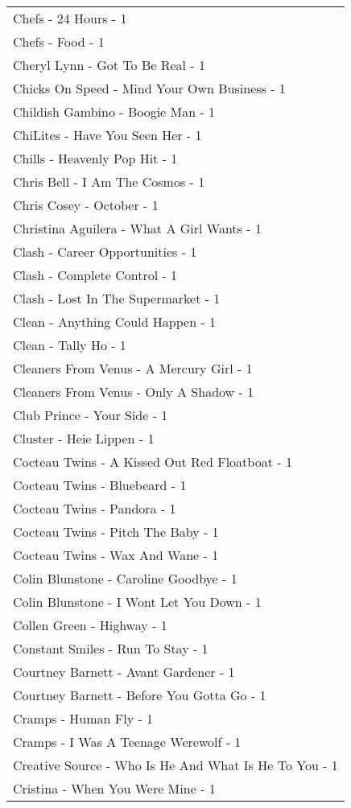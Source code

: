 \documentclass[
]{article}
\begin{document}
\begin{longtable}{l}
Chefs - 24 Hours - 1 \\ 
Chefs - Food - 1 \\ 
Cheryl Lynn - Got To Be Real - 1 \\ 
Chicks On Speed - Mind Your Own Business - 1 \\ 
Childish Gambino - Boogie Man - 1 \\ 
ChiLites - Have You Seen Her - 1 \\ 
Chills - Heavenly Pop Hit - 1 \\ 
Chris Bell - I Am The Cosmos - 1 \\ 
Chris Cosey - October - 1 \\ 
Christina Aguilera - What A Girl Wants - 1 \\ 
Clash - Career Opportunities - 1 \\ 
Clash - Complete Control - 1 \\ 
Clash - Lost In The Supermarket - 1 \\ 
Clean - Anything Could Happen - 1 \\ 
Clean - Tally Ho - 1 \\ 
Cleaners From Venus - A Mercury Girl - 1 \\ 
Cleaners From Venus - Only A Shadow - 1 \\ 
Club Prince - Your Side - 1 \\ 
Cluster - Heie Lippen - 1 \\ 
Cocteau Twins - A Kissed Out Red Floatboat - 1 \\ 
Cocteau Twins - Bluebeard - 1 \\ 
Cocteau Twins - Pandora - 1 \\ 
Cocteau Twins - Pitch The Baby - 1 \\ 
Cocteau Twins - Wax And Wane - 1 \\ 
Colin Blunstone - Caroline Goodbye - 1 \\ 
Colin Blunstone - I Wont Let You Down - 1 \\ 
Collen Green - Highway - 1 \\ 
Constant Smiles - Run To Stay - 1 \\ 
Courtney Barnett - Avant Gardener - 1 \\ 
Courtney Barnett - Before You Gotta Go - 1 \\ 
Cramps - Human Fly - 1 \\ 
Cramps - I Was A Teenage Werewolf - 1 \\ 
Creative Source - Who Is He And What Is He To You - 1 \\ 
Cristina - When You Were Mine - 1 \\ 

\end{longtable}
\end{document}
